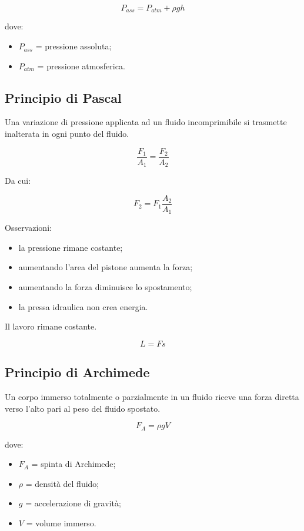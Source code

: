 \[
P_{ass}=P_{atm}+\rho gh
\]

\noindent dove:

\begin{itemize}
    \item $P_{ass}$ = pressione assoluta;
    \item $P_{atm}$ = pressione atmosferica.
\end{itemize}

\subsection{Principio di Pascal}

Una variazione di pressione applicata ad un fluido incomprimibile si trasmette inalterata in ogni punto del fluido.

\[
\frac{F_1}{A_1}=\frac{F_2}{A_2}
\]

\noindent Da cui:

\[
F_2=F_1\frac{A_2}{A_1}
\]

\noindent Osservazioni:

\begin{itemize}
    \item la pressione rimane costante;
    \item aumentando l'area del pistone aumenta la forza;
    \item aumentando la forza diminuisce lo spostamento;
    \item la pressa idraulica non crea energia.
\end{itemize}

\noindent Il lavoro rimane costante.

\[
L=Fs
\]

\subsection{Principio di Archimede}

Un corpo immerso totalmente o parzialmente in un fluido riceve una forza diretta verso l'alto pari al peso del fluido spostato.

\[
F_A=\rho gV
\]

\noindent dove:

\begin{itemize}
    \item $F_A$ = spinta di Archimede;
    \item $\rho$ = densità del fluido;
    \item $g$ = accelerazione di gravità;
    \item $V$ = volume immerso.
\end{itemize}

